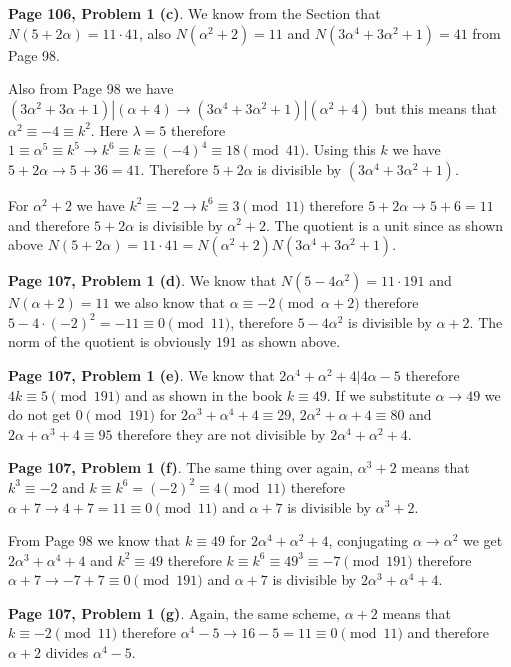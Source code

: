\documentclass[aps,preprint,preprintnumbers,nofootinbib,showpacs,prd]{revtex4-1}
\begin{document}
{\bf Page 106, Problem 1 (c)}. We know from the Section that $N(5 + 2\alpha) = 11 \cdot 41$, also $N(\alpha^2 + 2) = 11$ and $N(3\alpha^4 + 3\alpha^2 + 1) = 41$ from Page 98. 

Also from Page 98 we have $(3\alpha^2 + 3\alpha + 1)|(\alpha + 4) \to (3\alpha^4 + 3\alpha^2 + 1)|(\alpha^2 + 4)$ but this means that $\alpha^2 \equiv -4 \equiv k^2$. Here $\lambda = 5$ therefore $1 \equiv \alpha^5 \equiv k^5 \to k^6 \equiv k \equiv (-4)^4 \equiv 18 \pmod{41}$. Using this $k$ we have $5 + 2\alpha \to 5 + 36 = 41$. Therefore $5 + 2\alpha$ is divisible by $(3\alpha^4 + 3\alpha^2 + 1)$.

For $\alpha^2 + 2$ we have $k^2 \equiv -2 \to k^6 \equiv 3 \pmod{11}$ therefore $5 + 2\alpha \to 5 + 6 = 11$ and therefore $5 + 2\alpha$ is divisible by $\alpha^2 + 2$. The quotient is a unit since as shown above $N(5 + 2\alpha) = 11 \cdot 41 = N(\alpha^2 + 2) N(3\alpha^4 + 3\alpha^2 + 1)$.

{\bf Page 107, Problem 1 (d)}. We know that $N(5 - 4\alpha^2) = 11 \cdot 191$ and $N(\alpha + 2) = 11$ we also know that $\alpha \equiv -2 \pmod{\alpha + 2}$ therefore $5 - 4\cdot (-2)^2 = -11 \equiv 0 \pmod{11}$, therefore $5 - 4\alpha^2$ is divisible by $\alpha + 2$. The norm of the quotient is obviously $191$ as shown above.

{\bf Page 107, Problem 1 (e)}. We know that $2\alpha^4 + \alpha^2 + 4 | 4\alpha - 5$ therefore $4k \equiv 5 \pmod{191}$ and as shown in the book $k \equiv 49$. If we substitute $\alpha \to 49$ we do not get $0 \pmod{191}$ for $2\alpha^3 + \alpha^4 + 4 \equiv 29$, $2\alpha^2 + \alpha + 4 \equiv 80$ and $2\alpha + \alpha^3 + 4 \equiv 95$ therefore they are not divisible by $2\alpha^4 + \alpha^2 + 4$.

{\bf Page 107, Problem 1 (f)}. The same thing over again, $\alpha^3 + 2$ means that $k^3 \equiv -2$ and $k \equiv k^6 = (-2)^2 \equiv 4 \pmod{11}$ therefore $\alpha + 7 \to 4 + 7 = 11 \equiv 0 \pmod{11}$ and $\alpha + 7$ is divisible by $\alpha^3 + 2$.

From Page 98 we know that $k \equiv 49$ for $2\alpha^4 + \alpha^2 + 4$, conjugating $\alpha \to \alpha^2$ we get $2\alpha^3 + \alpha^4 + 4$ and $k^2 \equiv 49$ therefore $k \equiv k^6 \equiv 49^3 \equiv -7 \pmod{191}$ therefore $\alpha + 7 \to -7 + 7 \equiv 0 \pmod{191}$ and $\alpha + 7$ is divisible by $2\alpha^3 + \alpha^4 + 4$.

{\bf Page 107, Problem 1 (g)}. Again, the same scheme, $\alpha + 2$ means that $k \equiv -2 \pmod{11}$ therefore $\alpha^4 - 5 \to 16 - 5 = 11 \equiv 0 \pmod{11}$ and therefore $\alpha + 2$ divides $\alpha^4 - 5$.
\end{document}
